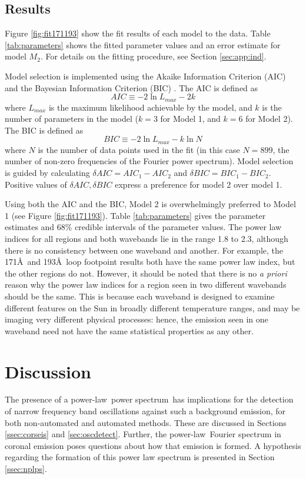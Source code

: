 \documentclass{aastex}
\newcommand{\PS}{power spectrum}
\newcommand{\PL}{power-law}
\begin{document}
\subsection{Results}\label{ssec:results}
Figure \ref{fig:fit171193} show the fit results of each model to the
data.  Table \ref{tab:parameters} shows the fitted parameter values
and an error estimate for model $M_{2}$.  For details on the fitting
procedure, see Section \ref{sec:app:ind}.

Model selection is implemented using the Akaike Information Criterion
(AIC) and the Bayesian Information Criterion (BIC)
\citep{2007MNRAS.377L..74L}.  The AIC is defined as
\begin{equation}\label{eqn:aic}
AIC \equiv -2 \ln L_{max} - 2k
\end{equation}
where $L_{max}$ is the maximum likelihood achievable by the model, and
$k$ is the number of parameters in the model ($k=3$ for Model 1, and
$k=6$ for Model 2).  The BIC is defined as
\begin{equation}\label{eqn:bic}
BIC \equiv -2 \ln L_{max} - k\ln N
\end{equation}
where $N$ is the number of data points used in the fit (in this case
$N=899$, the number of non-zero frequencies of the Fourier power
spectrum).  Model selection is guided by calculating $\delta AIC =
AIC_{1} - AIC_{2}$ and $\delta BIC = BIC_{1} - BIC_{2}$.  Positive
values of $\delta AIC, \delta BIC$ express a preference for model 2
over model 1.

Using both the AIC and the BIC, Model 2 is overwhelmingly preferred to
Model 1 (see Figure \ref{fig:fit171193}). Table \ref{tab:parameters}
gives the parameter estimates and 68\% credible intervals of the
parameter values.  The power law indices for all regions and both
wavebands lie in the range 1.8 to 2.3, although there is no
consistency between one waveband and another.  For example, the
171\AA\ and 193\AA\ loop footpoint results both have the same power
law index, but the other regions do not.  However, it should be noted
that there is no {\it a priori} reason why the power law indices for a
region seen in two different wavebands should be the same.  This is
because each waveband is designed to examine different features on the
Sun in broadly different temperature ranges, and may be imaging very
different physical processes: hence, the emission seen in one waveband
need not have the same statistical properties as any other.



\section{Discussion}
The presence of a \PL\ \PS\ has implications for the detection of
narrow frequency band oscillations against such a background emission,
for both non-automated and automated methods.  These are discussed in
Sections \ref{ssec:corseis} and \ref{sec:oscdetect}.  Further, the
\PL\ Fourier spectrum in coronal emission poses questions about how
that emission is formed.  A hypothesis regarding the formation of this
power law spectrum is presented in Section \ref{ssec:nplps}.
\end{document}

